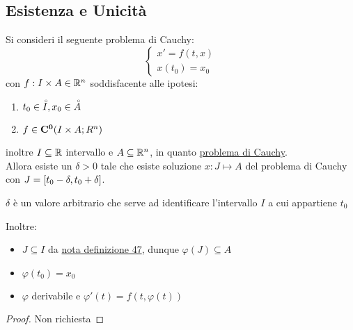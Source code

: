 \subsection{Esistenza e Unicità}
\begin{proposition}
	\label{teo:peano}
	Si consideri il seguente problema di Cauchy:
	$$\left\{\begin{matrix} x'=f(t,x)\\x(t_0)=x_0\end{matrix}\right.$$
	con $f:I\times A\in \mathbb{R}^n$ soddisfacente alle ipotesi:
	\begin{enumerate}
		\item $t_0\in \accentset{\circ}{I}, x_0\in \accentset{\circ}{A}$
		\item $f\in \mathbf{C^{0}}(I\times A;R^n)$
	\end{enumerate}
	inoltre $I\subseteq \mathbb{R}$ intervallo e $A\subseteq \mathbb{R}^n$, in quanto \hyperref[def:prob_cauchy_ord_1]{problema di Cauchy}.\\
	Allora esiste un $\delta>0$ tale che esiste soluzione $x:J\mapsto A$ del problema di Cauchy con $J=\left[t_0-\delta,t_0+\delta\right]$.
	\begin{note}
		$\delta$ è un valore arbitrario che serve ad identificare l'intervallo $I$ a cui appartiene $t_0$
	\end{note}
	\noindent Inoltre:
	\begin{itemize}
		\item $J\subseteq I$ da \hyperlink{note:diff_eq_sol_definit_set}{nota definizione 47}, dunque $\varphi(J)\subseteq A$
		\item $\varphi(t_0)=x_0$
		\item $\varphi$ derivabile e $\varphi'(t)=f(t,\varphi(t))$
	\end{itemize}
	\begin{proof}
		Non richiesta
	\end{proof}
\end{proposition}
